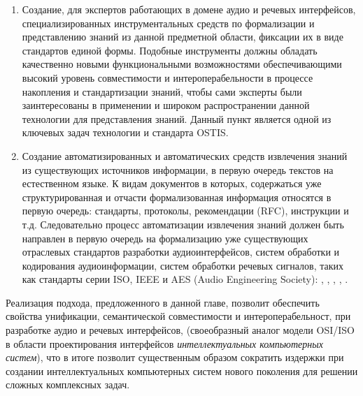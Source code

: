 \begin{enumerate}
  \item Создание, для экспертов работающих в домене аудио и речевых интерфейсов, специализированных инструментальных средств по формализации и представлению знаний из данной предметной области, фиксации их в виде стандартов единой формы. Подобные инструменты должны обладать качественно новыми функциональными возможностями обеспечивающими высокий уровень совместимости и интероперабельности в процессе накопления и стандартизации знаний, чтобы сами эксперты были заинтересованы в применении и широком распространении данной технологии для представления знаний. Данный пункт является одной из ключевых задач технологии и стандарта OSTIS.
  \item Создание автоматизированных и автоматических средств извлечения знаний из существующих источников информации, в первую очередь текстов на естественном языке. К видам документов в которых, содержаться уже структурированная и отчасти формализованная информация относятся в первую очередь: стандарты, протоколы,  рекомендации (RFC), инструкции и т.д. Следовательно процесс автоматизации извлечения знаний должен быть направлен в первую очередь на формализацию уже существующих отраслевых стандартов разработки аудиоинтерфейсов, систем обработки и кодирования аудиоинформации, систем обработки речевых сигналов, таких как стандарты серии ISO, IEEE и AES (Audio Engineering Society): , , , , .
\end{enumerate}

Реализация подхода, предложенного в данной главе, позволит обеспечить свойства унификации, семантической совместимости и интероперабельност, при разработке аудио и речевых интерфейсов, (своеобразный аналог модели OSI/ISO в области проектирования интерфейсов \textit{интеллектуальных компьютерных систем}), что в итоге позволит существенным образом сократить издержки при создании интеллектуальных компьютерных систем нового поколения для решении сложных комплексных задач.


%